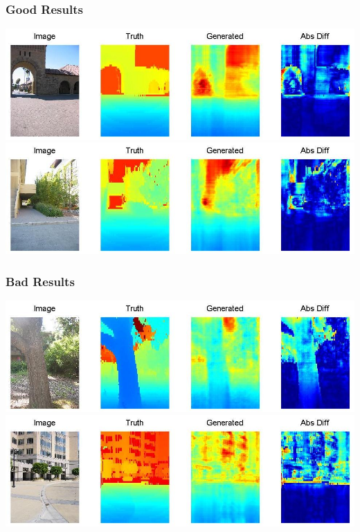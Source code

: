 \documentclass[handout]{beamer}
\begin{document}
\begin{frame}[t]\frametitle{Good Results}
    \includegraphics[width=\linewidth]{good3.jpg} \\
    \vfill\includegraphics[width=\linewidth]{good4.jpg}
\end{frame}

\begin{frame}[t]\frametitle{Bad Results}
    \includegraphics[width=\linewidth]{bad1.jpg} \\
    \vfill\includegraphics[width=\linewidth]{bad2.jpg}
\end{frame}
\end{document}
